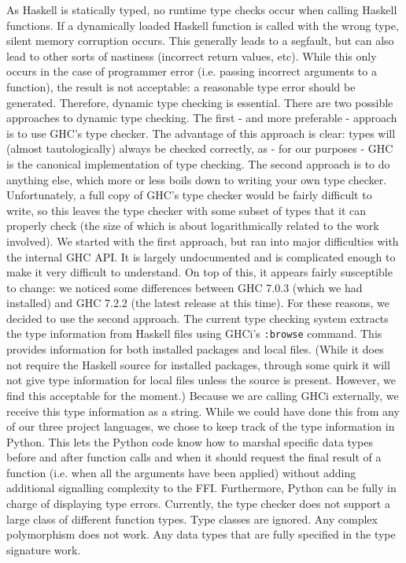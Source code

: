 \documentclass[11pt, letterpaper, oneside, twocolumn] {article}
\begin{document}
As Haskell is statically typed, no runtime type checks occur when calling Haskell functions.  If a dynamically loaded Haskell function is called with the wrong type, silent memory corruption occurs.  This generally leads to a segfault, but can also lead to other sorts of nastiness (incorrect return values, etc).  While this only occurs in the case of programmer error (i.e. passing incorrect arguments to a function), the result is not acceptable: a reasonable type error should be generated.  Therefore, dynamic type checking is essential.
There are two possible approaches to dynamic type checking.  The first - and more preferable - approach is to use GHC's type checker.  The advantage of this approach is clear: types will (almost tautologically) always be checked correctly, as - for our purposes - GHC is the canonical implementation of type checking.  The second approach is to do anything else, which more or less boils down to writing your own type checker.  Unfortunately, a full copy of GHC's type checker would be fairly difficult to write, so this leaves the type checker with some subset of types that it can properly check (the size of which is about logarithmically related to the work involved).
We started with the first approach, but ran into major difficulties with the internal GHC API.  It is largely undocumented and is complicated enough to make it very difficult to understand.  On top of this, it appears fairly susceptible to change: we noticed some differences between GHC 7.0.3 (which we had installed) and GHC 7.2.2 (the latest release at this time).  For these reasons, we decided to use the second approach. 
The current type checking system extracts the type information from Haskell files using GHCi's \verb!:browse! command.  This provides information for both installed packages and local files.  (While it does not require the Haskell source for installed packages, through some quirk it will not give type information for local files unless the source is present.  However, we find this acceptable for the moment.)  Because we are calling GHCi externally, we receive this type information as a string.  While we could have done this from any of our three project languages, we chose to keep track of the type information in Python. This lets the Python code know how to marshal specific data types before and after function calls and when it should request the final result of a function (i.e. when all the arguments have been applied) without adding additional signalling complexity to the FFI. Furthermore, Python can be fully in charge of displaying type errors.
Currently, the type checker does not support a large class of different function types.  Type classes are ignored.  Any complex polymorphism does not work.  Any data types that are fully specified in the type signature work.
\end{document}
